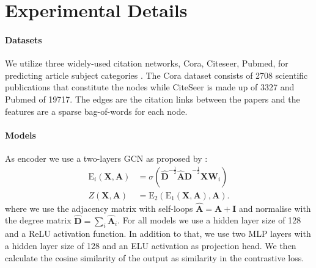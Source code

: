 \documentclass[tablecaption=bottom,wcp]{jmlr} %
\begin{document}


\newpage

\appendix



\section{Experimental Details}\label{apd:exp details}
\paragraph{Datasets}
We utilize three widely-used citation networks, Cora, Citeseer, Pubmed, for predicting article subject categories \citep{cora_citation,citation_networks}. The Cora dataset consists of 2708 scientific publications that constitute the nodes while CiteSeer is made up of 3327 and Pubmed of 19717. The edges are the citation links between the papers and the features are a sparse bag-of-words for each node.

\paragraph{Models}
As encoder we use a two-layers GCN as proposed by \citet{kipf2016semi}:
\begin{equation}
\begin{aligned}
\mathrm{E}_i(\boldsymbol{X}, \boldsymbol{A}) & =\sigma\left(\hat{\boldsymbol{D}}^{-\frac{1}{2}} \hat{\boldsymbol{A}} \hat{\boldsymbol{D}}^{-\frac{1}{2}} \boldsymbol{X} \boldsymbol{W}_i\right) \\
Z(\boldsymbol{X}, \boldsymbol{A}) & =\mathrm{E}_2\left(\mathrm{E}_1(\boldsymbol{X}, \boldsymbol{A}), \boldsymbol{A}\right) .
\end{aligned}
\end{equation}
where we use the adjacency matrix with self-loops $\hat{\boldsymbol{A}}= \boldsymbol{A} + \boldsymbol{I}$  and normalise with the degree matrix  $\hat{\boldsymbol{D}}=\sum_i \hat{\boldsymbol{A}}_i$. For all models we use a hidden layer size of 128 and a ReLU activation function. In addition to that, we use two MLP layers with a hidden layer size of 128 and an ELU activation as  projection head. We then calculate the cosine similarity of the output as similarity in the contrastive loss. 
\end{document}
